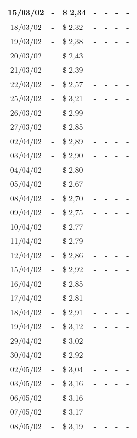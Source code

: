 \begin{center}
\begin{longtable}{|c|p{1.5cm}|p{1.5cm}|p{1.5cm}|p{1.5cm}|p{1.5cm}|p{1.5cm}|}
15/03/02 & - & \$ 2,34 & - & - & - & - \\ \hline
18/03/02 & - & \$ 2,32 & - & - & - & - \\ \hline
19/03/02 & - & \$ 2,38 & - & - & - & - \\ \hline
20/03/02 & - & \$ 2,43 & - & - & - & - \\ \hline
21/03/02 & - & \$ 2,39 & - & - & - & - \\ \hline
22/03/02 & - & \$ 2,57 & - & - & - & - \\ \hline
25/03/02 & - & \$ 3,21 & - & - & - & - \\ \hline
26/03/02 & - & \$ 2,99 & - & - & - & - \\ \hline
27/03/02 & - & \$ 2,85 & - & - & - & - \\ \hline
02/04/02 & - & \$ 2,89 & - & - & - & - \\ \hline
03/04/02 & - & \$ 2,90 & - & - & - & - \\ \hline
04/04/02 & - & \$ 2,80 & - & - & - & - \\ \hline
05/04/02 & - & \$ 2,67 & - & - & - & - \\ \hline
08/04/02 & - & \$ 2,70 & - & - & - & - \\ \hline
09/04/02 & - & \$ 2,75 & - & - & - & - \\ \hline
10/04/02 & - & \$ 2,77 & - & - & - & - \\ \hline
11/04/02 & - & \$ 2,79 & - & - & - & - \\ \hline
12/04/02 & - & \$ 2,86 & - & - & - & - \\ \hline
15/04/02 & - & \$ 2,92 & - & - & - & - \\ \hline
16/04/02 & - & \$ 2,85 & - & - & - & - \\ \hline
17/04/02 & - & \$ 2,81 & - & - & - & - \\ \hline
18/04/02 & - & \$ 2,91 & - & - & - & - \\ \hline
19/04/02 & - & \$ 3,12 & - & - & - & - \\ \hline
29/04/02 & - & \$ 3,02 & - & - & - & - \\ \hline
30/04/02 & - & \$ 2,92 & - & - & - & - \\ \hline
02/05/02 & - & \$ 3,04 & - & - & - & - \\ \hline
03/05/02 & - & \$ 3,16 & - & - & - & - \\ \hline
06/05/02 & - & \$ 3,16 & - & - & - & - \\ \hline
07/05/02 & - & \$ 3,17 & - & - & - & - \\ \hline
08/05/02 & - & \$ 3,19 & - & - & - & - \\ \hline

\end{longtable}
\end{center}
